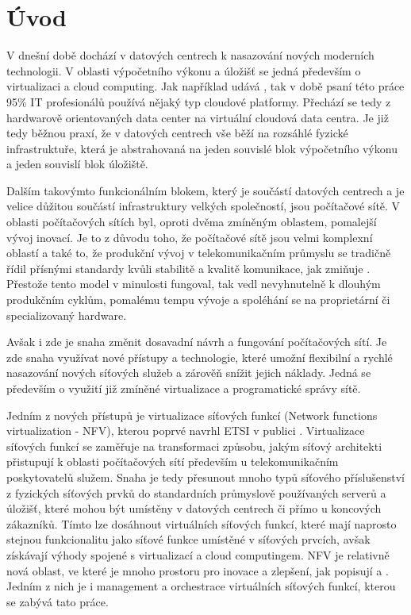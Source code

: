 
\chapter{Úvod}

V dnešní době dochází v datových centrech k nasazování nových moderních technologii. V oblasti výpočetního výkonu a úložišť se jedná především o virtualizaci a cloud computing. Jak například udává \cite{Cloud_adoption} , tak v době psaní této práce 95\% IT profesionálů používá nějaký typ cloudové platformy. Přechází se tedy z hardwarově orientovaných data center na virtuální cloudová data centra. Je již tedy běžnou praxí, že v datových centrech vše běží na rozsáhlé fyzické infrastruktuře, která je abstrahovaná na jeden souvislé blok výpočetního výkonu a jeden souvislí blok úložiště.

Dalším takovýmto funkcionálním blokem, který je součástí datových centrech a je velice důžitou součástí infrastruktury velkých společností, jsou počítačové sítě. V oblasti počítačových sítích byl, oproti dvěma zmíněným oblastem, pomalejší vývoj inovací. Je to z důvodu toho, že počítačové sítě jsou velmi komplexní oblastí a také to, že produkční vývoj v telekomunikačním průmyslu se tradičně řídil přísnými standardy kvůli stabilitě a kvalitě komunikace, jak zmiňuje \cite{telco} . Přestože tento model v minulosti fungoval, tak vedl nevyhnutelně k dlouhým produkčním cyklům, pomalému tempu vývoje a spoléhání se na proprietární či specializovaný hardware.  

Avšak i zde je snaha změnit dosavadní návrh a fungování počítačových sítí. Je zde snaha využívat nové přístupy a technologie, které umožní flexibilní a rychlé nasazování nových síťových služeb a zárověň snížit jejich náklady. Jedná se především o využití již zmíněné virtualizace a programatické správy sítě. \cite{Toward_Unified}

Jedním z nových přístupů je virtualizace síťových funkcí (Network functions virtualization - NFV), kterou poprvé navrhl ETSI v publici \cite{NFV_paper2012} . Virtualizace síťových funkcí se zaměřuje na transformaci způsobu, jakým síťový architekti přistupují k oblasti počítačových sítí především u telekomunikačním poskytovatelů služem. Snaha je tedy přesunout mnoho typů síťového příslušenství z fyzických síťových prvků do standardních průmyslově používaných serverů a úložišť, které mohou být umístěny v datových centrech či přímo u koncových zákazníků. Tímto lze dosáhnout virtuálních síťových funkcí, které mají naprosto stejnou funkcionalitu jako síťové funkce umístěné v síťových prvcích, avšak získávají výhody spojené s virtualizací a cloud computingem. NFV je relativně nová oblast, ve které je mnoho prostoru pro inovace a zlepšení, jak popisují \cite{NFVChalanges} a \cite{NFVState}. Jedním z nich je i management a orchestrace virtuálních síťových funkcí, kterou se zabývá tato práce.

